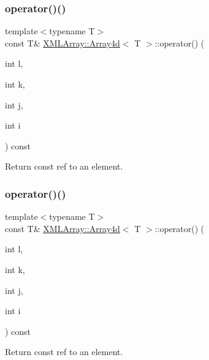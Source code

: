 \subsubsection{\texorpdfstring{operator()()}{operator()()}\hspace{0.1cm}{\footnotesize\ttfamily [5/6]}}
{\footnotesize\ttfamily template$<$typename T$>$ \\
const T\& \mbox{\hyperlink{classXMLArray_1_1Array4d}{X\+M\+L\+Array\+::\+Array4d}}$<$ T $>$\+::operator() (\begin{DoxyParamCaption}\item[{int}]{l,  }\item[{int}]{k,  }\item[{int}]{j,  }\item[{int}]{i }\end{DoxyParamCaption}) const\hspace{0.3cm}{\ttfamily [inline]}}



Return const ref to an element. 

\mbox{\label{classXMLArray_1_1Array4d_ae9076800aed9ec98d434d01fcaf4ba3a}} 
\subsubsection{\texorpdfstring{operator()()}{operator()()}\hspace{0.1cm}{\footnotesize\ttfamily [6/6]}}
{\footnotesize\ttfamily template$<$typename T$>$ \\
const T\& \mbox{\hyperlink{classXMLArray_1_1Array4d}{X\+M\+L\+Array\+::\+Array4d}}$<$ T $>$\+::operator() (\begin{DoxyParamCaption}\item[{int}]{l,  }\item[{int}]{k,  }\item[{int}]{j,  }\item[{int}]{i }\end{DoxyParamCaption}) const\hspace{0.3cm}{\ttfamily [inline]}}



Return const ref to an element. 

\mbox{\label{classXMLArray_1_1Array4d_accb002ecd8742a2aba3e4acaf92963c6}} 

